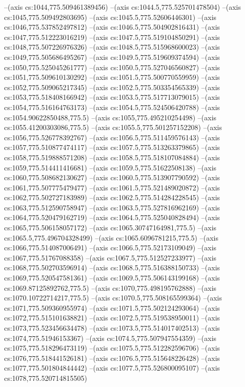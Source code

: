 --(axis cs:1044,775.509461389456)
--(axis cs:1044.5,775.525701478504)
--(axis cs:1045,775.509492803695)
--(axis cs:1045.5,775.52606446301)
--(axis cs:1046,775.537852497812)
--(axis cs:1046.5,775.504902816431)
--(axis cs:1047,775.512223016219)
--(axis cs:1047.5,775.519104850291)
--(axis cs:1048,775.507226976326)
--(axis cs:1048.5,775.515968600023)
--(axis cs:1049,775.505686495267)
--(axis cs:1049.5,775.519609374594)
--(axis cs:1050,775.525045261777)
--(axis cs:1050.5,775.527046560827)
--(axis cs:1051,775.509610130292)
--(axis cs:1051.5,775.500770559959)
--(axis cs:1052,775.509065217345)
--(axis cs:1052.5,775.503354565339)
--(axis cs:1053,775.518408166942)
--(axis cs:1053.5,775.517713079015)
--(axis cs:1054,775.516164763173)
--(axis cs:1054.5,775.524506420788)
--(axis cs:1054.90622850488,775.5)
--(axis cs:1055,775.495210254498)
--(axis cs:1055.41200303086,775.5)
--(axis cs:1055.5,775.501257152208)
--(axis cs:1056,775.526778392767)
--(axis cs:1056.5,775.511459576143)
--(axis cs:1057,775.510877474117)
--(axis cs:1057.5,775.513263379865)
--(axis cs:1058,775.519888571208)
--(axis cs:1058.5,775.518107084884)
--(axis cs:1059,775.514411416681)
--(axis cs:1059.5,775.51622508138)
--(axis cs:1060,775.508682130627)
--(axis cs:1060.5,775.513907790592)
--(axis cs:1061,775.507775479477)
--(axis cs:1061.5,775.521489020872)
--(axis cs:1062,775.502727183989)
--(axis cs:1062.5,775.514284228545)
--(axis cs:1063,775.512590758947)
--(axis cs:1063.5,775.527816962169)
--(axis cs:1064,775.520479162719)
--(axis cs:1064.5,775.525040828494)
--(axis cs:1065,775.506158057172)
--(axis cs:1065.30747164981,775.5)
--(axis cs:1065.5,775.496704328499)
--(axis cs:1065.6096781215,775.5)
--(axis cs:1066,775.514087006491)
--(axis cs:1066.5,775.52173109049)
--(axis cs:1067,775.51767088358)
--(axis cs:1067.5,775.512527233977)
--(axis cs:1068,775.502703596914)
--(axis cs:1068.5,775.516388150733)
--(axis cs:1069,775.520547581361)
--(axis cs:1069.5,775.506143199168)
--(axis cs:1069.87125892762,775.5)
--(axis cs:1070,775.498195762888)
--(axis cs:1070.10722714217,775.5)
--(axis cs:1070.5,775.508165599364)
--(axis cs:1071,775.509360955974)
--(axis cs:1071.5,775.502124293064)
--(axis cs:1072,775.515101638821)
--(axis cs:1072.5,775.519538950011)
--(axis cs:1073,775.523456634478)
--(axis cs:1073.5,775.514017402513)
--(axis cs:1074,775.51946153367)
--(axis cs:1074.5,775.507947554359)
--(axis cs:1075,775.518296473119)
--(axis cs:1075.5,775.512282596706)
--(axis cs:1076,775.518441526181)
--(axis cs:1076.5,775.515648226428)
--(axis cs:1077,775.501804844442)
--(axis cs:1077.5,775.526800095107)
--(axis cs:1078,775.520714815505)
